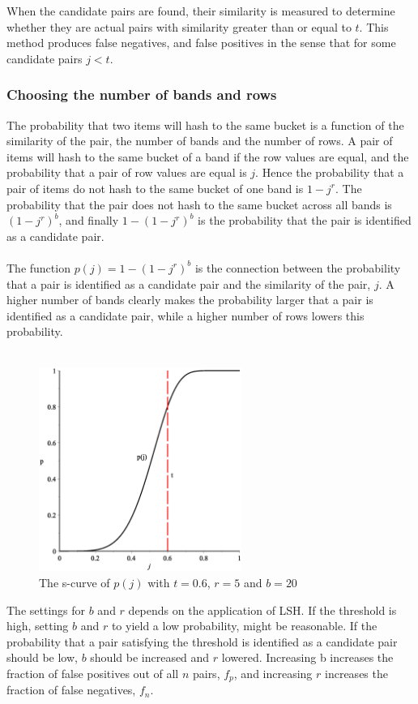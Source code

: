 When the candidate pairs are found, their similarity is measured to determine whether they are actual pairs with similarity greater than or equal to \(t\). This method produces false negatives, and false positives in the sense that for some candidate pairs \(j<t\).

\subsubsection{Choosing the number of bands and rows}
The probability that two items will hash to the same bucket is a function of the similarity of the pair, the number of bands and the number of rows. A pair of items will hash to the same bucket of a band if the row values are equal, and the probability that a pair of row values are equal is \(j\). Hence the probability that a pair of items do not hash to the same bucket of one band is \(1-j^r\). The probability that the pair does not hash to the same bucket across all bands is \((1-j^r)^b\), and finally \(1-(1-j^r)^b\) is the probability that the pair is identified as a candidate pair.\\ \\
The function \(p(j) = 1-(1-j^r)^b\) is the connection between the probability that a pair is identified as a candidate pair and the similarity of the pair, \(j\). A higher number of bands clearly makes the probability larger that a pair is identified as a candidate pair, while a higher number of rows lowers this probability.\\ \\
\begin{figure}[H]
	\centering
	\includegraphics[width=250px]{img/pGraph.eps}
	\caption{The s-curve of \(p(j)\) with \(t = 0.6\), \(r = 5\) and \(b =20\)} 
	\label{fig:p_graph}
\end{figure}
The settings for \(b\) and \(r\) depends on the application of LSH. If the threshold is high, setting \(b\) and \(r\) to yield a low probability, might be reasonable. If the probability that a pair satisfying the threshold is identified as a candidate pair should be low, \(b\) should be increased and \(r\) lowered. Increasing b increases the fraction of false positives out of all \(n\) pairs, \(f_p\), and increasing \(r\) increases the fraction of false negatives, \(f_n\).\\ \\
